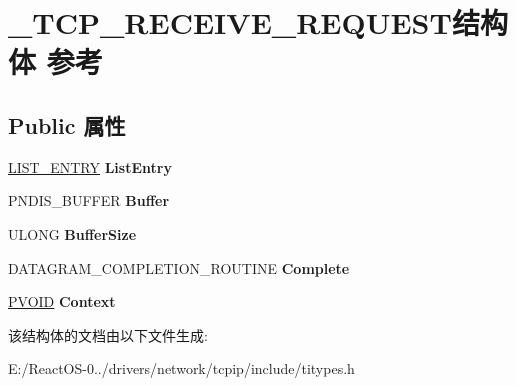\hypertarget{struct___t_c_p___r_e_c_e_i_v_e___r_e_q_u_e_s_t}{}\section{\+\_\+\+T\+C\+P\+\_\+\+R\+E\+C\+E\+I\+V\+E\+\_\+\+R\+E\+Q\+U\+E\+S\+T结构体 参考}
\label{struct___t_c_p___r_e_c_e_i_v_e___r_e_q_u_e_s_t}
\subsection*{Public 属性}
\begin{DoxyCompactItemize}
\item 
\mbox{\label{struct___t_c_p___r_e_c_e_i_v_e___r_e_q_u_e_s_t_a01a35c3d397e67cecdc40a7fa609342d}} 
\hyperlink{struct___l_i_s_t___e_n_t_r_y}{L\+I\+S\+T\+\_\+\+E\+N\+T\+RY} {\bfseries List\+Entry}
\item 
\mbox{\label{struct___t_c_p___r_e_c_e_i_v_e___r_e_q_u_e_s_t_afccea28397e34dd250d6cf7f8d528267}} 
P\+N\+D\+I\+S\+\_\+\+B\+U\+F\+F\+ER {\bfseries Buffer}
\item 
\mbox{\label{struct___t_c_p___r_e_c_e_i_v_e___r_e_q_u_e_s_t_a9ee08808f8c1440a8bd587033cd11c9a}} 
U\+L\+O\+NG {\bfseries Buffer\+Size}
\item 
\mbox{\label{struct___t_c_p___r_e_c_e_i_v_e___r_e_q_u_e_s_t_a3f117e39a96eedbda8edbbee044af02d}} 
D\+A\+T\+A\+G\+R\+A\+M\+\_\+\+C\+O\+M\+P\+L\+E\+T\+I\+O\+N\+\_\+\+R\+O\+U\+T\+I\+NE {\bfseries Complete}
\item 
\mbox{\label{struct___t_c_p___r_e_c_e_i_v_e___r_e_q_u_e_s_t_ae6eaec638553ce0e71e0d551ffbd97e5}} 
\hyperlink{interfacevoid}{P\+V\+O\+ID} {\bfseries Context}
\end{DoxyCompactItemize}


该结构体的文档由以下文件生成\+:\begin{DoxyCompactItemize}
\item 
E\+:/\+React\+O\+S-\/0../drivers/network/tcpip/include/titypes.\+h\end{DoxyCompactItemize}
